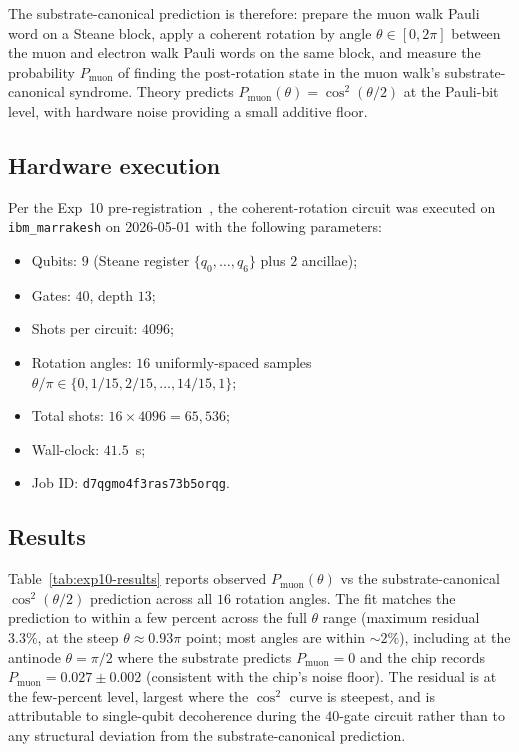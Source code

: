 \documentclass[11pt]{article}
\begin{document}
The substrate-canonical prediction is therefore: prepare the muon walk Pauli word on a Steane block, apply a coherent rotation by angle $\theta \in [0, 2\pi]$ between the muon and electron walk Pauli words on the same block, and measure the probability $P_\text{muon}$ of finding the post-rotation state in the muon walk's substrate-canonical syndrome.  Theory predicts $P_\text{muon}(\theta) = \cos^2(\theta/2)$ at the Pauli-bit level, with hardware noise providing a small additive floor.

\subsection{Hardware execution}
\label{sec:exp10-execution}

Per the Exp~10 pre-registration~\cite{Exp10Prereg}, the coherent-rotation circuit was executed on \texttt{ibm\_marrakesh} on 2026-05-01 with the following parameters:
\begin{itemize}
\item Qubits: $9$ (Steane register $\{q_0, \ldots, q_6\}$ plus $2$ ancillae);
\item Gates: $40$, depth $13$;
\item Shots per circuit: $4096$;
\item Rotation angles: $16$ uniformly-spaced samples $\theta / \pi \in \{0, 1/15, 2/15, \ldots, 14/15, 1\}$;
\item Total shots: $16 \times 4096 = 65{,}536$;
\item Wall-clock: $41.5$~s;
\item Job ID: \texttt{d7qgmo4f3ras73b5orqg}.
\end{itemize}

\subsection{Results}
\label{sec:exp10-results}

Table~\ref{tab:exp10-results} reports observed $P_\text{muon}(\theta)$ vs the substrate-canonical $\cos^2(\theta/2)$ prediction across all $16$ rotation angles.  The fit matches the prediction to within a few percent across the full $\theta$ range (maximum residual $3.3\%$, at the steep $\theta \approx 0.93\pi$ point; most angles are within $\sim 2\%$), including at the antinode $\theta = \pi/2$ where the substrate predicts $P_\text{muon} = 0$ and the chip records $P_\text{muon} = 0.027 \pm 0.002$ (consistent with the chip's noise floor).  The residual is at the few-percent level, largest where the $\cos^2$ curve is steepest, and is attributable to single-qubit decoherence during the $40$-gate circuit rather than to any structural deviation from the substrate-canonical prediction.
\end{document}
